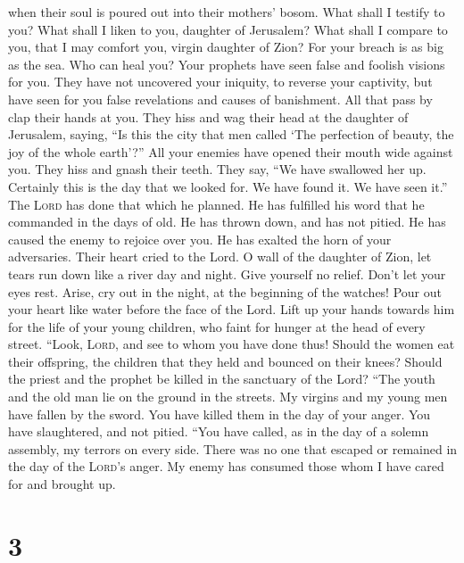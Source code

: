 when their soul is poured out into their mothers' bosom. 
What shall I testify to you? What shall I liken to you, daughter of
Jerusalem? What shall I compare to you, that I may comfort you, virgin
daughter of Zion? For your breach is as big as the sea. Who can heal
you?  Your prophets have seen false and foolish visions
for you. They have not uncovered your iniquity, to reverse your
captivity, but have seen for you false revelations and causes of
banishment.  All that pass by clap their hands at you.
They hiss and wag their head at the daughter of Jerusalem, saying, ``Is
this the city that men called `The perfection of beauty, the joy of the
whole earth'?''  All your enemies have opened their mouth
wide against you. They hiss and gnash their teeth. They say, ``We have
swallowed her up. Certainly this is the day that we looked for. We have
found it. We have seen it.''  The \textsc{Lord} has done
that which he planned. He has fulfilled his word that he commanded in
the days of old. He has thrown down, and has not pitied. He has caused
the enemy to rejoice over you. He has exalted the horn of your
adversaries.  Their heart cried to the Lord. O wall of
the daughter of Zion, let tears run down like a river day and night.
Give yourself no relief. Don't let your eyes rest. 
Arise, cry out in the night, at the beginning of the watches! Pour out
your heart like water before the face of the Lord. Lift up your hands
towards him for the life of your young children, who faint for hunger at
the head of every street.  ``Look, \textsc{Lord}, and see
to whom you have done thus! Should the women eat their offspring, the
children that they held and bounced on their knees? Should the priest
and the prophet be killed in the sanctuary of the Lord? 
``The youth and the old man lie on the ground in the streets. My virgins
and my young men have fallen by the sword. You have killed them in the
day of your anger. You have slaughtered, and not pitied. 
``You have called, as in the day of a solemn assembly, my terrors on
every side. There was no one that escaped or remained in the day of the
\textsc{Lord}'s anger. My enemy has consumed those whom I have cared for
and brought up.

\hypertarget{section-2}{%
\section{3}\label{section-2}}

